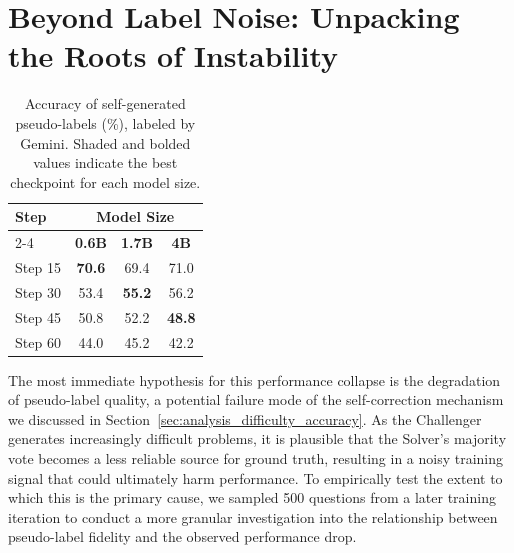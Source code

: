 \section{Beyond Label Noise: Unpacking the Roots of Instability}
\label{app:scaling_ana}
\begin{table} %
\vspace{-13pt}
    \centering
    \caption{Accuracy of self-generated pseudo-labels (\%), labeled by Gemini. Shaded and bolded values indicate the best checkpoint for each model size.}
    \label{tab:pseudo_label_accuracy_shaded}
    \vspace{-0.1in}
    \begin{tabular}{l c c c}
        \toprule
        \textbf{Step} & \multicolumn{3}{c}{\textbf{Model Size}} \\
        \cmidrule(lr){2-4} %
                         & \textbf{0.6B} & \textbf{1.7B} & \textbf{4B} \\
        \midrule
        Step 15           & \cellcolor{gray!15}\textbf{70.6} & 69.4          & 71.0          \\
        Step 30           & 53.4          & \cellcolor{gray!15}\textbf{55.2} & 56.2          \\
        Step 45           & 50.8          & 52.2          & \cellcolor{gray!15}\textbf{48.8} \\
        Step 60           & 44.0          & 45.2          & 42.2          \\
        \bottomrule
    \end{tabular}
    \vspace{-0.2in}
\end{table}

The most immediate hypothesis for this performance collapse is the degradation of pseudo-label quality, a potential failure mode of the self-correction mechanism we discussed in Section~\ref{sec:analysis_difficulty_accuracy}. As the Challenger generates increasingly difficult problems, it is plausible that the Solver's majority vote becomes a less reliable source for ground truth, resulting in a noisy training signal that could ultimately harm performance. To empirically test the extent to which this is the primary cause, we sampled 500 questions from a later training iteration to conduct a more granular investigation into the relationship between pseudo-label fidelity and the observed performance drop.

